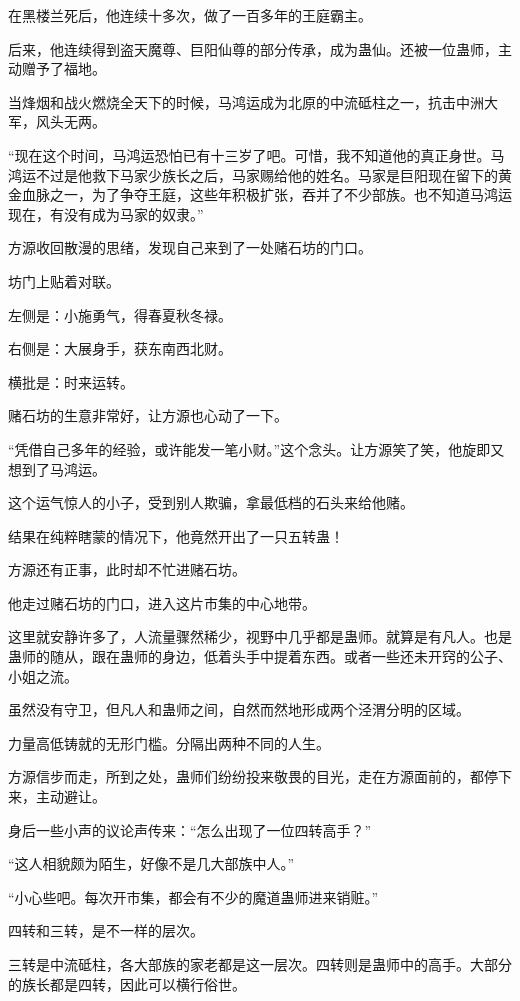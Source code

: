 \begin{this_body}
在黑楼兰死后，他连续十多次，做了一百多年的王庭霸主。

后来，他连续得到盗天魔尊、巨阳仙尊的部分传承，成为蛊仙。还被一位蛊师，主动赠予了福地。

当烽烟和战火燃烧全天下的时候，马鸿运成为北原的中流砥柱之一，抗击中洲大军，风头无两。

“现在这个时间，马鸿运恐怕已有十三岁了吧。可惜，我不知道他的真正身世。马鸿运不过是他救下马家少族长之后，马家赐给他的姓名。马家是巨阳现在留下的黄金血脉之一，为了争夺王庭，这些年积极扩张，吞并了不少部族。也不知道马鸿运现在，有没有成为马家的奴隶。”

方源收回散漫的思绪，发现自己来到了一处赌石坊的门口。

坊门上贴着对联。

左侧是：小施勇气，得春夏秋冬禄。

右侧是：大展身手，获东南西北财。

横批是：时来运转。

赌石坊的生意非常好，让方源也心动了一下。

“凭借自己多年的经验，或许能发一笔小财。”这个念头。让方源笑了笑，他旋即又想到了马鸿运。

这个运气惊人的小子，受到别人欺骗，拿最低档的石头来给他赌。

结果在纯粹瞎蒙的情况下，他竟然开出了一只五转蛊！

方源还有正事，此时却不忙进赌石坊。

他走过赌石坊的门口，进入这片市集的中心地带。

这里就安静许多了，人流量骤然稀少，视野中几乎都是蛊师。就算是有凡人。也是蛊师的随从，跟在蛊师的身边，低着头手中提着东西。或者一些还未开窍的公子、小姐之流。

虽然没有守卫，但凡人和蛊师之间，自然而然地形成两个泾渭分明的区域。

力量高低铸就的无形门槛。分隔出两种不同的人生。

方源信步而走，所到之处，蛊师们纷纷投来敬畏的目光，走在方源面前的，都停下来，主动避让。

身后一些小声的议论声传来：“怎么出现了一位四转高手？”

“这人相貌颇为陌生，好像不是几大部族中人。”

“小心些吧。每次开市集，都会有不少的魔道蛊师进来销赃。”

四转和三转，是不一样的层次。

三转是中流砥柱，各大部族的家老都是这一层次。四转则是蛊师中的高手。大部分的族长都是四转，因此可以横行俗世。


\end{this_body}
